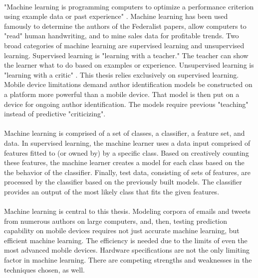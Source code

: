 	\paragraph{}"Machine learning is programming computers to optimize a performance criterion using example data or past experience" \cite{alpaydin_introduction_2004}.  Machine learning has been used famously to determine the authors of the Federalist papers, allow computers to "read" human handwriting, and to mine sales data for profitable trends.  Two broad categories of machine learning are supervised learning and unsupervised learning.  Supervised learning is "learning with a teacher."  The teacher can show the learner what to do based on examples or experience. Unsupervised learning is "learning with a critic" \cite{alpaydin_introduction_2004}. This thesis relies exclusively on supervised learning. Mobile device limitations demand author identification models be constructed on a platform more powerful than a mobile device.  That model is then put on a device for ongoing author identification.  The models require previous "teaching" instead of predictive "criticizing".

	\paragraph{}Machine learning is comprised of a set of classes, a classifier, a feature set, and data.  In supervised learning, the machine learner uses a data input comprised of features fitted to (or owned by) by a specific class.  Based on creatively counting these features, the machine learner creates a model for each class based on the the behavior of the classifier.  Finally, test data, consisting of sets of features, are processed by the classifier based on the previously built models.  The classifier provides an output of the most likely class that fits the given features.

	\paragraph{}Machine learning is central to this thesis.  Modeling corpora of emails and tweets from numerous authors on large computers, and, then, testing prediction capability on mobile devices requires not just accurate machine learning, but efficient machine learning.  The efficiency is needed due to the limits of even the most advanced mobile devices. Hardware specifications are not the only limiting factor in machine learning.  There are competing strengths and weaknesses in the techniques chosen, as well.

